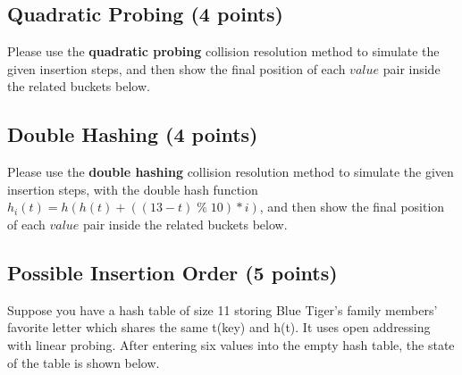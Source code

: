 \documentclass[11pt]{exam}
\begin{document}
\subsection{Quadratic Probing (4 points)}
Please use the \textbf{quadratic probing} collision resolution method to simulate the given insertion steps, and then show the final position of each $value$ pair inside the related buckets below.
\begin{solution}
    \begin{table}[H]
        \centering
        \renewcommand{\arraystretch}{2}
    \end{table}
\end{solution}

\subsection{Double Hashing (4 points)}
Please use the \textbf{double hashing} collision resolution method to simulate the given insertion steps, with the double hash function $h_i(t) = h(h(t)+((13-t)\;\%\; 10) * i)$, and then show the final position of each $value$ pair inside the related buckets below.
\begin{solution}
    \begin{table}[H]
        \centering
        \renewcommand{\arraystretch}{2}
    \end{table}
\end{solution}

\subsection{Possible Insertion Order (5 points)}
Suppose you have a hash table of size 11 storing Blue Tiger's family members' favorite letter which shares the same t(key) and h(t). It uses open addressing with linear probing. After entering six values into the empty hash table, the state of the table is shown below.
\end{document}
